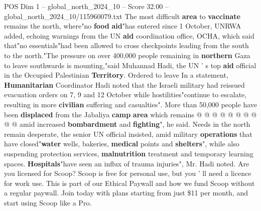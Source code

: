 \begin{textsample}{POS Dim 1 – global\_north\_2024\_10 – Score 32.00 – global\_north\_2024\_10/115960079.txt}
The most difficult \textbf{area} to \textbf{vaccinate} remains the north, where"no \textbf{food} \textbf{aid}"has entered since 1 October, UNRWA added, echoing warnings from the UN \textbf{aid} coordination office, OCHA, which said that"no essentials"had been allowed to cross checkpoints leading from the south to the north."The pressure on over 400,000 people remaining in \textbf{northern} Gaza to leave southwards is mounting,"said Muhannad Hadi, the UN ' s top \textbf{aid} official in the Occupied Palestinian \textbf{Territory}.
Ordered to leave In a statement, \textbf{Humanitarian} Coordinator Hadi noted that the Israeli military had reissued evacuation orders on 7, 9 and 12 October while hostilities"continue to escalate, resulting in more \textbf{civilian} suffering and casualties".
More than 50,000 people have been \textbf{displaced} from the Jabaliya \textbf{camp} \textbf{area} which remains @ @ @ @ @ @ @ @ @ @ amid increased \textbf{bombardment} and \textbf{fighting}", he said.
Needs in the north remain desperate, the senior UN official insisted, amid military \textbf{operations} that have closed"\textbf{water} wells, bakeries, \textbf{medical} points and \textbf{shelters}", while also suspending protection services, \textbf{malnutrition} treatment and temporary learning spaces. \textbf{Hospitals}"have seen an influx of trauma injuries", Mr.
Hadi noted.
Are you licensed for Scoop?
Scoop is free for personal use, but you ' ll need a licence for work use.
This is part of our Ethical Paywall and how we fund Scoop without a regular paywall.
Join today with plans starting from just \$11 per month, and start using Scoop like a Pro.

\end{textsample}
